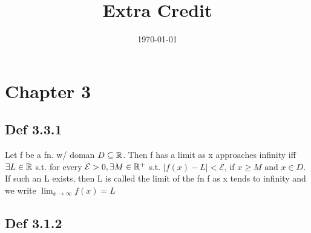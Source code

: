 

\title{Extra Credit} %
\author{}
\date{\today} %



\maketitle

\section*{Chapter 3}
\subsection*{Def 3.3.1}
    Let f be a fn. w/ doman $D \subseteq \mathbb{R}$. Then f has a limit as x approaches infinity iff $\exists L \in \mathbb{R}$ s.t. for every $\mathcal{E} > 0, \exists M \in \mathbb{R}^+$ s.t. $|f(x) - L| < \mathcal{E}$, if $x \ge M \text{ and } x \in D$.
    If such an L exists, then L is called the limit of the fn f as x tends to infinity and we write $\lim_{x \to \infty} f(x) = L$

\subsection*{Def 3.1.2}

